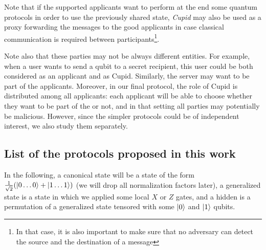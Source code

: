 \begin{itemize}
        Note that if the supported applicants want to perform at the end some quantum protocols in order to use the previously shared \GHZ{} state, \emph{Cupid} may also be used as a proxy forwarding the messages to the good applicants in case classical communication is required between participants\footnote{In that case, it is also important to make sure that no adversary can detect the source and the destination of a message}.
\end{itemize}

Note also that these parties may not be always different entities. For example, when a user wants to send a qubit to a secret recipient, this user could be both considered as an applicant and as Cupid. Similarly, the server may want to be part of the applicants. Moreover, in our final protocol, the role of Cupid is distributed among all applicants: each applicant will be able to choose whether they want to be part of the \GHZ{} or not, and in that setting all parties may potentially be malicious. However, since the simpler protocols could be of independent interest, we also study them separately.

\subsection{List of the protocols proposed in this work}\label{subsec:listProtocols}

In the following, a canonical \GHZ{} state will be a state of the form $\frac{1}{\sqrt{2}}(\ket{0 \dots 0} + \ket{1 \dots 1})$ (we will drop all normalization factors later), a generalized \GHZ{} state is a \GHZ{} state in which we applied some local $X$ or $Z$ gates, and a hidden \GHZ{} is a permutation of a generalized \GHZ{} state tensored with some $\ket{0}$ and $\ket{1}$ qubits.

